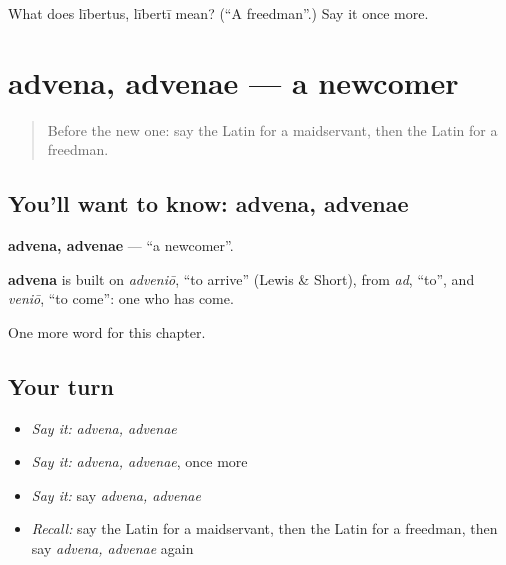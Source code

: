 \begin{tcolorbox}[breakable,colback=teal!4,colframe=teal!35!black,title={Before you move on}]
What does lībertus, lībertī mean? (\textquotedblleft{}A freedman\textquotedblright{}.) Say it once more.
\end{tcolorbox}
\section[advena, advenae]{advena, advenae — a newcomer}

\label{lesson:LA-C220-advena}



\begin{quote}
Before the new one: say the Latin for a maidservant, then the Latin for a freedman.
\end{quote}

\subsection*{You'll want to know: advena, advenae}
\textbf{advena, advenae} — \textquotedblleft{}a newcomer\textquotedblright{}.

\begin{cousinweb}
\textbf{advena} is built on \emph{adveniō}, \textquotedblleft{}to arrive\textquotedblright{} (Lewis \& Short), from \emph{ad}, \textquotedblleft{}to\textquotedblright{}, and \emph{veniō}, \textquotedblleft{}to come\textquotedblright{}: one who has come.
\end{cousinweb}

\begin{grammarlens}[title={What you've built}]
One more word for this chapter.
\end{grammarlens}

\subsection*{Your turn}
\begin{itemize}
\raggedright
  \item \emph{Say it:} \emph{advena, advenae}
  \item \emph{Say it:} \emph{advena, advenae}, once more
  \item \emph{Say it:} say \emph{advena, advenae}
  \item \emph{Recall:} say the Latin for a maidservant, then the Latin for a freedman, then say \emph{advena, advenae} again
\end{itemize}


